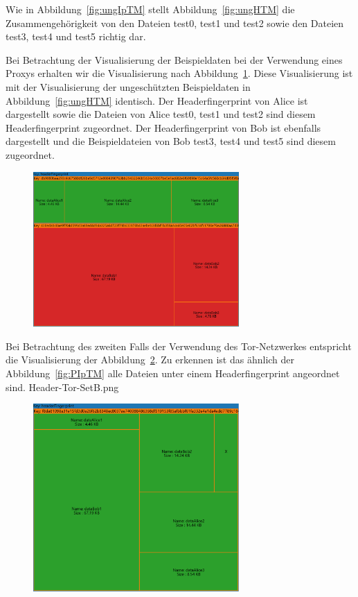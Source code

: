 \documentclass[
    fontsize=12pt,
    headings=small,
    parskip=half,           %
    bibliography=totoc,
    numbers=noenddot,       %
    open=any,               %
    ]{scrreprt}
\begin{document}
Wie in Abbildung~\ref{fig:ungIpTM} stellt Abbildung~\ref{fig:ungHTM} die Zusammengehörigkeit von den Dateien test0, test1 und test2 sowie den Dateien test3, test4 und test5 richtig dar.

Bei Betrachtung der Visualisierung der Beispieldaten bei der Verwendung eines Proxys erhalten wir die Visualisierung nach Abbildung~\ref{fig:PHTM}.
Diese Visualisierung ist mit der Visualisierung der ungeschützten Beispieldaten in Abbildung~\ref{fig:ungHTM} identisch. 
Der Headerfingerprint von Alice ist dargestellt sowie die Dateien von Alice test0, test1 und test2 sind diesem Headerfingerprint zugeordnet.
Der Headerfingerprint von Bob ist ebenfalls dargestellt und die Beispieldateien von Bob test3, test4 und test5 sind diesem zugeordnet.

\begin{figure}[H]
\includegraphics[width=0.7\textwidth]{../pic/Header-Proxy-SetA.png}
\label{fig:PHTM}
\end{figure}

Bei Betrachtung des zweiten Falls der Verwendung des Tor-Netzwerkes entspricht die Visualisierung der Abbildung~\ref{fig:THTM}.
Zu erkennen ist das ähnlich der Abbildung~\ref{fig:PIpTM} alle Dateien unter einem Headerfingerprint angeordnet sind.
Header-Tor-SetB.png
\begin{figure}[H]
\includegraphics[width=0.7\textwidth]{../pic/Header-Tor-SetB.png}
\label{fig:THTM}
\end{figure}
\end{document}
